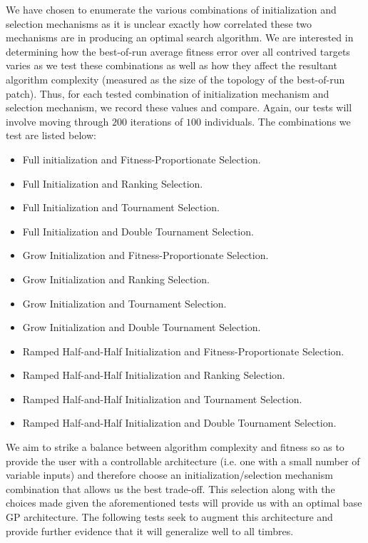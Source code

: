 \documentclass[12pt]{report} 	%
\numberwithin{figure}{chapter}
\numberwithin{table}{chapter}
\numberwithin{equation}{chapter}
\begin{document}
\begin{flushleft}
We have chosen to enumerate the various combinations of initialization and selection mechanisms as it is unclear exactly how correlated these two mechanisms are in producing an optimal search algorithm. We are interested in determining how the best-of-run average fitness error over all contrived targets varies as we test these combinations as well as how they affect the resultant algorithm complexity (measured as the size of the topology of the best-of-run patch). Thus, for each tested combination of initialization mechanism and selection mechanism, we record these values and compare. Again, our tests will involve moving through $200$ iterations of $100$ individuals. The combinations we test are listed below:
\begin{itemize}
\item Full initialization and Fitness-Proportionate Selection.
\item Full Initialization and Ranking Selection.
\item Full Initialization and Tournament Selection.
\item Full Initialization and Double Tournament Selection.
\item Grow Initialization and Fitness-Proportionate Selection.
\item Grow Initialization and Ranking Selection.
\item Grow Initialization and Tournament Selection.
\item Grow Initialization and Double Tournament Selection.
\item Ramped Half-and-Half Initialization and Fitness-Proportionate Selection.
\item Ramped Half-and-Half Initialization and Ranking Selection.
\item Ramped Half-and-Half Initialization and Tournament Selection.
\item Ramped Half-and-Half Initialization and Double Tournament Selection.
\end{itemize}
We aim to strike a balance between algorithm complexity and fitness so as to provide the user with a controllable architecture (i.e. one with a small number of variable inputs) and therefore choose an initialization/selection mechanism combination that allows us the best trade-off. This selection along with the choices made given the aforementioned tests will provide us with an optimal base GP architecture. The following tests seek to augment this architecture and provide further evidence that it will generalize well to all timbres.


\end{flushleft}
\end{document}
